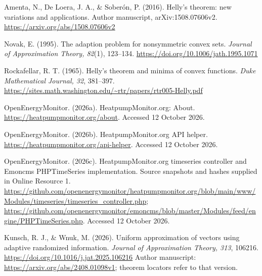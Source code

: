 Amenta, N., De Loera, J. A., \& Sober\'on, P. (2016). Helly's theorem: new variations
and applications. Author manuscript, arXiv:1508.07606v2.
\url{https://arxiv.org/abs/1508.07606v2}

Novak, E. (1995). The adaption problem for nonsymmetric convex sets.
\emph{Journal of Approximation Theory, 82}(1), 123--134.
\url{https://doi.org/10.1006/jath.1995.1071}

Rockafellar, R. T. (1965). Helly's theorem and minima of convex functions.
\emph{Duke Mathematical Journal, 32}, 381--397.
\url{https://sites.math.washington.edu/~rtr/papers/rtr005-Helly.pdf}

OpenEnergyMonitor. (2026a). HeatpumpMonitor.org: About.
\url{https://heatpumpmonitor.org/about}. Accessed 12 October 2026.

OpenEnergyMonitor. (2026b). HeatpumpMonitor.org API helper.
\url{https://heatpumpmonitor.org/api-helper}. Accessed 12 October 2026.

OpenEnergyMonitor. (2026c). HeatpumpMonitor.org timeseries controller and
Emoncms PHPTimeSeries implementation. Source snapshots and hashes supplied
in Online Resource 1.
\url{https://github.com/openenergymonitor/heatpumpmonitor.org/blob/main/www/Modules/timeseries/timeseries_controller.php};
\url{https://github.com/openenergymonitor/emoncms/blob/master/Modules/feed/engine/PHPTimeSeries.php}.
Accessed 12 October 2026.

Kunsch, R. J., \& Wnuk, M. (2026).
Uniform approximation of vectors using adaptive randomized information.
\emph{Journal of Approximation Theory, 313}, 106216.
\url{https://doi.org/10.1016/j.jat.2025.106216}
Author manuscript: \url{https://arxiv.org/abs/2408.01098v1};
theorem locators refer to that version.
